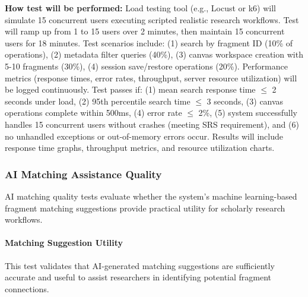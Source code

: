 \documentclass[12pt, titlepage]{article}
\begin{document}
\begin{enumerate}
\textbf{How test will be performed:} Load testing tool (e.g., Locust or k6) will simulate 15 concurrent users executing scripted realistic research workflows. Test will ramp up from 1 to 15 users over 2 minutes, then maintain 15 concurrent users for 18 minutes. Test scenarios include: (1) search by fragment ID (10\% of operations), (2) metadata filter queries (40\%), (3) canvas workspace creation with 5-10 fragments (30\%), (4) session save/restore operations (20\%). Performance metrics (response times, error rates, throughput, server resource utilization) will be logged continuously. Test passes if: (1) mean search response time $\leq$ 2 seconds under load, (2) 95th percentile search time $\leq$ 3 seconds, (3) canvas operations complete within 500ms, (4) error rate $\leq$ 2\%, (5) system successfully handles 15 concurrent users without crashes (meeting SRS requirement), and (6) no unhandled exceptions or out-of-memory errors occur. Results will include response time graphs, throughput metrics, and resource utilization charts.

\end{enumerate}

\subsubsection{AI Matching Assistance Quality}

AI matching quality tests evaluate whether the system's machine learning-based fragment matching suggestions provide practical utility for scholarly research workflows.

\paragraph{Matching Suggestion Utility}

This test validates that AI-generated matching suggestions are sufficiently accurate and useful to assist researchers in identifying potential fragment connections.
\end{document}
